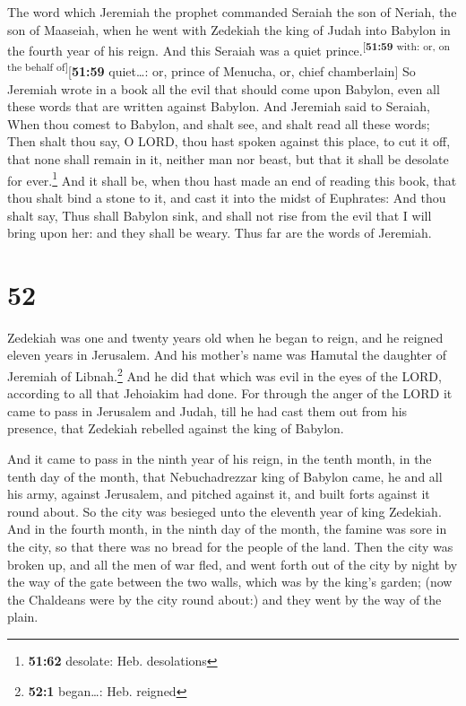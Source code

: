  The word which Jeremiah the prophet commanded Seraiah
the son of Neriah, the son of Maaseiah, when he went with Zedekiah the
king of Judah into Babylon in the fourth year of his reign. And this
Seraiah was a quiet prince.\textsuperscript{{[}\textbf{51:59} with: or,
on the behalf of{]}}{[}\textbf{51:59} quiet\ldots: or, prince of
Menucha, or, chief chamberlain{]}  So Jeremiah wrote in a
book all the evil that should come upon Babylon, even all these words
that are written against Babylon.  And Jeremiah said to
Seraiah, When thou comest to Babylon, and shalt see, and shalt read all
these words;  Then shalt thou say, O LORD, thou hast
spoken against this place, to cut it off, that none shall remain in it,
neither man nor beast, but that it shall be desolate for
ever.\footnote{\textbf{51:62} desolate: Heb. desolations}
 And it shall be, when thou hast made an end of reading
this book, that thou shalt bind a stone to it, and cast it into the
midst of Euphrates:  And thou shalt say, Thus shall
Babylon sink, and shall not rise from the evil that I will bring upon
her: and they shall be weary. Thus far are the words of Jeremiah.

\hypertarget{section-51}{%
\section{52}\label{section-51}}

 Zedekiah was one and twenty years old when he began to
reign, and he reigned eleven years in Jerusalem. And his mother's name
was Hamutal the daughter of Jeremiah of Libnah.\footnote{\textbf{52:1}
  began\ldots: Heb. reigned}  And he did that which was
evil in the eyes of the LORD, according to all that Jehoiakim had done.
 For through the anger of the LORD it came to pass in
Jerusalem and Judah, till he had cast them out from his presence, that
Zedekiah rebelled against the king of Babylon.

 And it came to pass in the ninth year of his reign, in
the tenth month, in the tenth day of the month, that Nebuchadrezzar king
of Babylon came, he and all his army, against Jerusalem, and pitched
against it, and built forts against it round about.  So
the city was besieged unto the eleventh year of king Zedekiah.
 And in the fourth month, in the ninth day of the month,
the famine was sore in the city, so that there was no bread for the
people of the land.  Then the city was broken up, and all
the men of war fled, and went forth out of the city by night by the way
of the gate between the two walls, which was by the king's garden; (now
the Chaldeans were by the city round about:) and they went by the way of
the plain.

